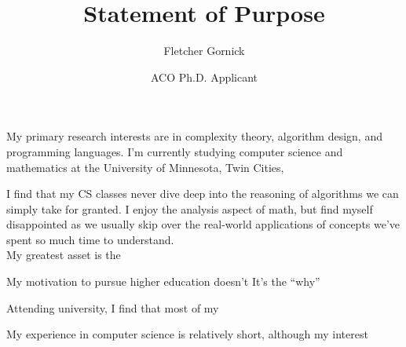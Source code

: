 \documentclass{article}
\title{Statement of Purpose}
\author{Fletcher Gornick}
\date{ACO Ph.D. Applicant}
\begin{document}
  \maketitle

  My primary research interests are in complexity theory, algorithm design, and programming languages.
  I'm currently studying computer science and mathematics at the University of Minnesota, Twin Cities,



  I find that my CS classes never dive deep into the reasoning of algorithms we can simply take for granted.
  I enjoy the analysis aspect of math, but find myself disappointed as we usually skip over the real-world 
  applications of concepts we've spent so much time to understand. \\


  

  My greatest asset is the 

  My motivation to pursue higher education doesn't
  It's the ``why''

  Attending university, I find that most of my

  My experience in computer science is relatively short, although my interest
\end{document}
